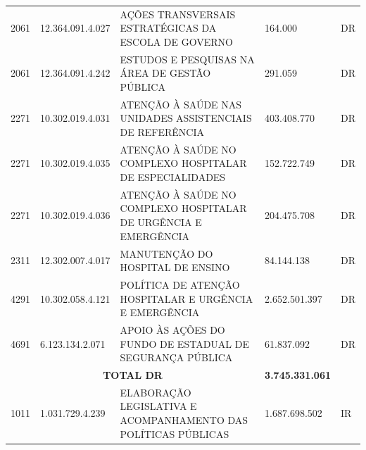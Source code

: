 \documentclass{article}
\begin{document}
\begin{longtable}[c]{m{1cm}|m{2cm}|m{10cm}|m{2cm}|m{1cm}}
\multicolumn{1}{C{1cm}|}{2061} & \multicolumn{1}{C{2cm}|}{12.364.091.4.027} & \multicolumn{1}{L{10cm}|}{AÇÕES TRANSVERSAIS ESTRATÉGICAS DA ESCOLA DE GOVERNO} & \multicolumn{1}{R{2cm}|}{164.000} & \multicolumn{1}{C{1cm}}{DR} \\
\multicolumn{1}{C{1cm}|}{2061} & \multicolumn{1}{C{2cm}|}{12.364.091.4.242} & \multicolumn{1}{L{10cm}|}{ESTUDOS E PESQUISAS NA ÁREA DE GESTÃO PÚBLICA} & \multicolumn{1}{R{2cm}|}{291.059} & \multicolumn{1}{C{1cm}}{DR} \\
\multicolumn{1}{C{1cm}|}{2271} & \multicolumn{1}{C{2cm}|}{10.302.019.4.031} & \multicolumn{1}{L{10cm}|}{ATENÇÃO À SAÚDE NAS UNIDADES ASSISTENCIAIS DE REFERÊNCIA} & \multicolumn{1}{R{2cm}|}{403.408.770} & \multicolumn{1}{C{1cm}}{DR} \\
\multicolumn{1}{C{1cm}|}{2271} & \multicolumn{1}{C{2cm}|}{10.302.019.4.035} & \multicolumn{1}{L{10cm}|}{ATENÇÃO À SAÚDE NO COMPLEXO HOSPITALAR DE ESPECIALIDADES} & \multicolumn{1}{R{2cm}|}{152.722.749} & \multicolumn{1}{C{1cm}}{DR} \\
\multicolumn{1}{C{1cm}|}{2271} & \multicolumn{1}{C{2cm}|}{10.302.019.4.036} & \multicolumn{1}{L{10cm}|}{ATENÇÃO À SAÚDE NO COMPLEXO HOSPITALAR DE URGÊNCIA E EMERGÊNCIA} & \multicolumn{1}{R{2cm}|}{204.475.708} & \multicolumn{1}{C{1cm}}{DR} \\
\multicolumn{1}{C{1cm}|}{2311} & \multicolumn{1}{C{2cm}|}{12.302.007.4.017} & \multicolumn{1}{L{10cm}|}{MANUTENÇÃO DO HOSPITAL DE ENSINO} & \multicolumn{1}{R{2cm}|}{84.144.138} & \multicolumn{1}{C{1cm}}{DR} \\
\multicolumn{1}{C{1cm}|}{4291} & \multicolumn{1}{C{2cm}|}{10.302.058.4.121} & \multicolumn{1}{L{10cm}|}{POLÍTICA DE ATENÇÃO HOSPITALAR E URGÊNCIA E EMERGÊNCIA} & \multicolumn{1}{R{2cm}|}{2.652.501.397} & \multicolumn{1}{C{1cm}}{DR} \\
\multicolumn{1}{C{1cm}|}{4691} & \multicolumn{1}{C{2cm}|}{6.123.134.2.071} & \multicolumn{1}{L{10cm}|}{APOIO ÀS AÇÕES DO FUNDO DE ESTADUAL DE SEGURANÇA PÚBLICA} & \multicolumn{1}{R{2cm}|}{61.837.092} & \multicolumn{1}{C{1cm}}{DR} \\
\hline\hline
\multicolumn{3}{c|}{ \textbf{TOTAL DR}} & \multicolumn{1}{R{2cm}|}{ \textbf{3.745.331.061}} &  \\
\hline\hline
\multicolumn{1}{C{1cm}|}{1011} & \multicolumn{1}{C{2cm}|}{1.031.729.4.239} & \multicolumn{1}{L{10cm}|}{ELABORAÇÃO LEGISLATIVA E ACOMPANHAMENTO DAS POLÍTICAS PÚBLICAS} & \multicolumn{1}{R{2cm}|}{1.687.698.502} & \multicolumn{1}{C{1cm}}{IR} \\

\end{longtable}
\end{document}
